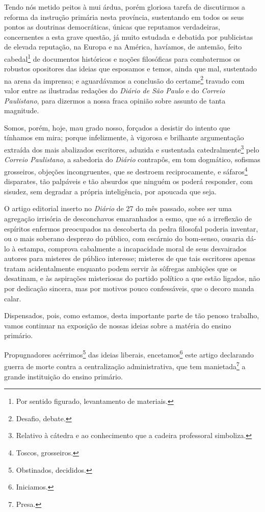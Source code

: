 Tendo nós metido peitos à mui árdua, porém gloriosa tarefa de
discutirmos a reforma da instrução primária nesta província, sustentando
em todos os seus pontos as doutrinas democráticas, únicas que reputamos
verdadeiras, concernentes a esta grave questão, já muito estudada e
debatida por publicistas de elevada reputação, na Europa e na América,
havíamos, de antemão, feito cabedal\footnote{Por sentido figurado,
  levantamento de materiais.} de documentos históricos e noções
filosóficas para combatermos os robustos opositores das ideias que
esposamos e temos, ainda que mal, sustentado na arena da imprensa; e
aguardávamos a conclusão do certame\footnote{Desafio, debate.} travado
com valor entre as ilustradas redações do \emph{Diário de São Paulo} e do
\emph{Correio Paulistano}, para dizermos a nossa fraca opinião sobre
assunto de tanta magnitude.

Somos, porém, hoje, mau grado nosso, forçados a desistir do intento que
tínhamos em mira; porque infelizmente, à vigorosa e brilhante
argumentação extraída dos mais abalizados escritores, aduzida e
sustentada catedralmente\footnote{Relativo à cátedra e ao conhecimento
  que a cadeira professoral simboliza.} pelo \emph{Correio Paulistano},
a sabedoria do \emph{Diário} contrapôs, em tom dogmático, sofismas
grosseiros, objeções incongruentes, que se destroem reciprocamente, e
sáfaros\footnote{Toscos, grosseiros.} disparates, tão palpáveis e tão
absurdos que ninguém os poderá responder, com sisudez, sem degradar a
própria inteligência, por apoucada que seja.

O artigo editorial inserto no \emph{Diário} de 27 do mês passado, sobre
ser uma agregação irrisória de desconchavos emaranhados a esmo, que só a
irreflexão de espíritos enfermos preocupados na descoberta da pedra
filosofal poderia inventar, ou o mais soberano desprezo do público, com
escárnio do bom-senso, ousaria dá-lo à estampa, comprova cabalmente a
incapacidade moral de seus desvairados autores para misteres de público
interesse; misteres de que tais escritores apenas tratam acidentalmente
enquanto podem servir às sôfregas ambições que os desatinam, e às
aspirações misteriosas do partido político a que estão ligados, não por
dedicação sincera, mas por motivos pouco confessáveis, que o decoro
manda calar.

Dispensados, pois, como estamos, desta importante parte de tão penoso
trabalho, vamos continuar na exposição de nossas ideias sobre a matéria
do ensino primário.

Propugnadores acérrimos\footnote{Obstinados, decididos.} das ideias
liberais, encetamos\footnote{Iniciamos.} este artigo declarando guerra
de morte contra a centralização administrativa, que tem
manietada\footnote{Presa.} a grande instituição do ensino primário.

